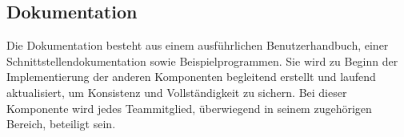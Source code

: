 \subsection{Dokumentation}
Die Dokumentation besteht aus einem ausführlichen Benutzerhandbuch, einer Schnittstellendokumentation sowie Beispielprogrammen. Sie wird zu Beginn der Implementierung der anderen Komponenten begleitend erstellt und laufend aktualisiert, um Konsistenz und Vollständigkeit zu sichern. Bei dieser Komponente wird jedes Teammitglied, überwiegend in seinem zugehörigen Bereich, beteiligt sein.
